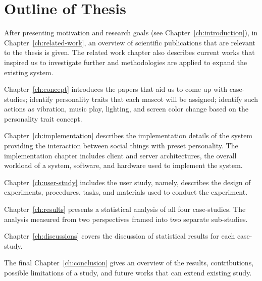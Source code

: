\section{Outline of Thesis}
\label{sec:outline-of-thesis}
After presenting motivation and research goals (see Chapter~\ref{ch:introduction}), in Chapter~\ref{ch:related-work},
an overview of scientific publications that are relevant to the thesis is given.
The related work chapter also describes current works that inspired us to investigate further
and methodologies are applied to expand the existing system.

Chapter~\ref{ch:concept} introduces the papers that aid us to come up with case-studies;
identify personality traits that each mascot will be assigned;
identify such actions as vibration, music play, lighting,
and screen color change based on the personality trait concept.

Chapter~\ref{ch:implementation} describes the implementation details of the system providing the
interaction between social things with preset personality.
The implementation chapter includes client and server architectures,
the overall workload of a system, software, and hardware used to implement the system.

Chapter~\ref{ch:user-study} includes the user study, namely, describes the design of
experiments, procedures, tasks, and materials used to conduct the experiment.

Chapter~\ref{ch:results} presents a statistical analysis of all four case-studies.
The analysis measured from two perspectives framed into two separate sub-studies.

Chapter~\ref{ch:discussions} covers the discussion of statistical results for each case-study.

The final Chapter~\ref{ch:conclusion} gives an overview of the results, contributions,
possible limitations of a study, and future works that can extend existing study.